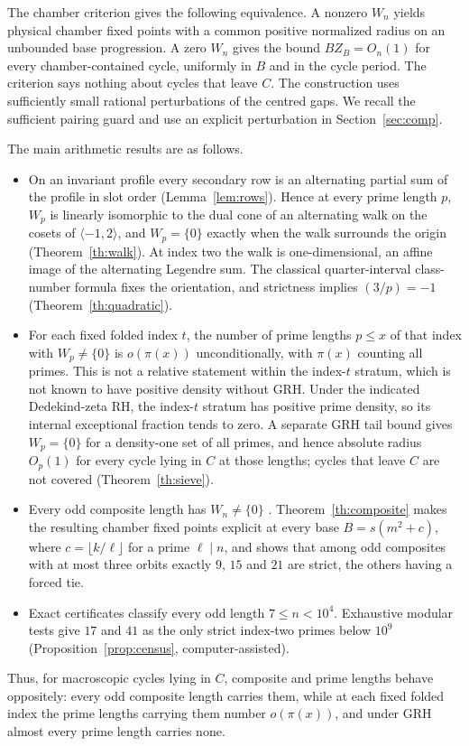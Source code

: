 \documentclass[11pt,reqno]{amsart}
\begin{document}
The chamber criterion \cite[Theorem~1]{G10} gives the following equivalence. A nonzero \(W_n\) yields physical chamber fixed points with a common positive normalized radius on an unbounded base progression. A zero \(W_n\) gives the bound \(BZ_B=O_n(1)\) for every chamber-contained cycle, uniformly in \(B\) and in the cycle period. The criterion says nothing about cycles that leave \(C\). The construction uses sufficiently small rational perturbations of the centred gaps. We recall the sufficient pairing guard and use an explicit perturbation in Section~\ref{sec:comp}.

The main arithmetic results are as follows.
\begin{itemize}
\item On an invariant profile every secondary row is an alternating partial sum of the profile in slot order (Lemma~\ref{lem:rows}). Hence at every prime length \(p\), \(W_p\) is linearly isomorphic to the dual cone of an alternating walk on the cosets of \(\langle-1,2\rangle\), and \(W_p=\{0\}\) exactly when the walk surrounds the origin (Theorem~\ref{th:walk}). At index two the walk is one-dimensional, an affine image of the alternating Legendre sum. The classical quarter-interval class-number formula fixes the orientation, and strictness implies \((3/p)=-1\) (Theorem~\ref{th:quadratic}).
\item For each fixed folded index \(t\), the number of prime lengths \(p\le x\) of that index with \(W_p\ne\{0\}\) is \(o(\pi(x))\) unconditionally, with \(\pi(x)\) counting all primes. This is not a relative statement within the index-\(t\) stratum, which is not known to have positive density without GRH. Under the indicated Dedekind-zeta RH, the index-\(t\) stratum has positive prime density, so its internal exceptional fraction tends to zero. A separate GRH tail bound gives \(W_p=\{0\}\) for a density-one set of all primes, and hence absolute radius \(O_p(1)\) for every cycle lying in \(C\) at those lengths; cycles that leave \(C\) are not covered (Theorem~\ref{th:sieve}).
\item Every odd composite length has \(W_n\ne\{0\}\) \cite[Section~3]{G10}. Theorem~\ref{th:composite} makes the resulting chamber fixed points explicit at every base \(B=s(m^2+c)\), where \(c=\lfloor k/\ell\rfloor\) for a prime \(\ell\mid n\), and shows that among odd composites with at most three orbits exactly \(9\), \(15\) and \(21\) are strict, the others having a forced tie.
\item Exact certificates classify every odd length \(7\le n<10^4\). Exhaustive modular tests give \(17\) and \(41\) as the only strict index-two primes below \(10^9\) (Proposition~\ref{prop:census}, computer-assisted).
\end{itemize}
Thus, for macroscopic cycles lying in \(C\), composite and prime lengths behave oppositely: every odd composite length carries them, while at each fixed folded index the prime lengths carrying them number \(o(\pi(x))\), and under GRH almost every prime length carries none.
\end{document}
